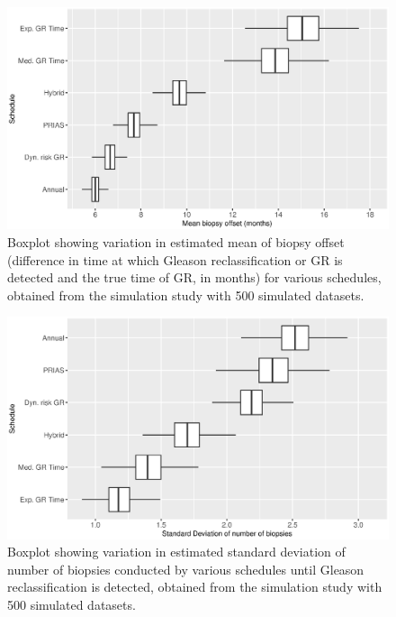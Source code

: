 \begin{figure}[!htb]
\centerline{\includegraphics[width=\columnwidth]{images/sim_study/offsetMeanBoxPlot_all.eps}}
\caption{Boxplot showing variation in estimated mean of biopsy offset (difference in time at which Gleason reclassification or GR is detected and the true time of GR, in months) for various schedules, obtained from the simulation study with 500 simulated datasets.}
\label{fig : offsetMeanBoxPlot_all}
\end{figure}

\begin{figure}[!htb]
\centerline{\includegraphics[width=\columnwidth]{images/sim_study/nbSDBoxPlot_all.eps}}
\caption{Boxplot showing variation in estimated standard deviation of number of biopsies conducted by various schedules until Gleason reclassification is detected, obtained from the simulation study with 500 simulated datasets.}
\label{fig : nbSDBoxPlot_all}
\end{figure}


